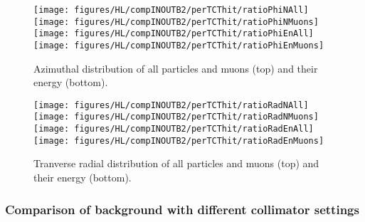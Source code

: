 \begin{figure}
\begin{center}
\texttt{[image: figures/HL/compINOUTB2/perTCThit/ratioPhiNAll]}
\texttt{[image: figures/HL/compINOUTB2/perTCThit/ratioPhiNMuons]}
\texttt{[image: figures/HL/compINOUTB2/perTCThit/ratioPhiEnAll]}
\texttt{[image: figures/HL/compINOUTB2/perTCThit/ratioPhiEnMuons]}
\end{center}
\vspace{-0.6cm}
 \caption{Azimuthal distribution of all particles and muons (top) and their energy (bottom).
  \label{compPhi}}
\end{figure}

\begin{figure}
\begin{center}
\texttt{[image: figures/HL/compINOUTB2/perTCThit/ratioRadNAll]}
\texttt{[image: figures/HL/compINOUTB2/perTCThit/ratioRadNMuons]}
\texttt{[image: figures/HL/compINOUTB2/perTCThit/ratioRadEnAll]}
\texttt{[image: figures/HL/compINOUTB2/perTCThit/ratioRadEnMuons]}
\end{center}
\vspace{-0.6cm}
 \caption{Tranverse radial distribution of all particles and muons (top) and their energy (bottom).
  \label{compRad}}
\end{figure}



\subsubsection{Comparison of background with different collimator settings}



